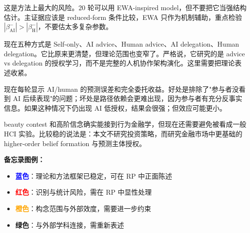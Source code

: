 \documentclass[12pt]{article}
\begin{document}
\begin{tcolorbox}[colback=red!5!white, colframe=red!75!black, title=\textbf{M5：EWA 会不会在 20 轮里估不稳？}]
这是方法上最大的风险。20 轮可以用 EWA-inspired model，但不要把它当强结构估计。主证据应该是 reduced-form 条件比较，EWA 只作为机制辅助，重点检验 $|\beta_{\text{AI}}^{-}| > |\beta_{\text{H}}^{-}|$，不要估太多复杂参数。
\end{tcolorbox}

\begin{tcolorbox}[colback=orange!5!white, colframe=orange!75!black, title=\textbf{M6：五种协作方式是否足够表达"角色学习"？}]
现在五种方式是 Self-only、AI advice、Human advice、AI delegation、Human delegation。它比原来更清楚，但理论范围也变窄了。严格说，它研究的是 advice vs delegation 的授权学习，而不是完整的人机协作架构演化。这里需要把理论表述收紧。
\end{tcolorbox}

\begin{tcolorbox}[colback=orange!5!white, colframe=orange!75!black, title=\textbf{M7：反馈信息给得太多，会不会削弱路径依赖？}]
现在每轮显示 AI/human 的预测误差和完全委托收益。好处是排除了"参与者没看到 AI 后续表现"的问题；坏处是路径依赖会更难出现，因为参与者有充分反事实信息。如果这种情况下仍出现 AI 低授权，结果会很强；但效应可能更小。
\end{tcolorbox}

\begin{tcolorbox}[colback=green!5!white, colframe=green!50!black, title=\textbf{M8：行为金融学连接够不够？}]
beauty contest 和高阶信念确实能接到行为金融学，但现在还需要避免被看成一般 HCI 实验。比较稳的说法是：本文不研究投资策略，而研究金融市场中更基础的 higher-order belief formation 与预测主体授权。
\end{tcolorbox}

\vspace{1em}
\noindent\textbf{备忘录图例：}
\begin{itemize}
    \item \textcolor{blue}{\textbf{蓝色}}：理论和方法框架已稳定，可在 RP 中正面陈述
    \item \textcolor{red}{\textbf{红色}}：识别与统计风险，需在 RP 中显性处理
    \item \textcolor{orange}{\textbf{橙色}}：构念范围与外部效度，需要进一步约束
    \item \textcolor{green!50!black}{\textbf{绿色}}：与外部学科连接，需重新表述
\end{itemize}
\end{document}
